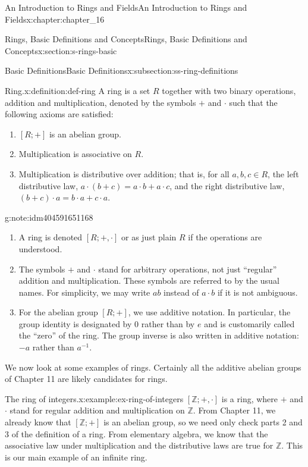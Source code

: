 \documentclass[twoside,10pt,]{book}
\numberwithin{equation}{section}
\begin{document}
\begin{chapterptx}{An Introduction to Rings and Fields}{}{An Introduction to Rings and Fields}{}{}{x:chapter:chapter_16}
\begin{sectionptx}{Rings, Basic Definitions and Concepts}{}{Rings, Basic Definitions and Concepts}{}{}{x:section:s-rings-basic}
\begin{subsectionptx}{Basic Definitions}{}{Basic Definitions}{}{}{x:subsection:ss-ring-definitions}
\begin{definition}{Ring.}{x:definition:def-ring}
%
\label{g:notation:idm404591659744}%
A ring is a set \(R\) together with two binary operations, addition and multiplication, denoted by the symbols \(+\) and \(\cdot\) such that the following axioms are satisfied:%
\begin{enumerate}[label=(\arabic*)]
\item{}\([R; +]\) is an abelian group.%
\item{}Multiplication is associative on \(R\).%
\item{}Multiplication is distributive over addition; that is, for all \(a, b, c \in R\), the left distributive law, \(a \cdot (b + c) = a \cdot b + a\cdot c\), and the right distributive law, \((b + c)\cdot a = b\cdot a + c\cdot a\).%
\end{enumerate}
%
\end{definition}
\begin{note}{}{g:note:idm404591651168}%
%
\begin{enumerate}[label=(\arabic*)]
\item{}A ring is denoted  \([R;+, \cdot ]\) or as just plain \(R\) if the operations are understood.%
\item{}The symbols \(+\) and \(\cdot\) stand for arbitrary operations, not just ``regular'' addition and multiplication. These symbols are referred to by the usual names. For simplicity, we may write \(a b\) instead of \(a\cdot b\) if it is not ambiguous.%
\item{}For the abelian group \([R; +]\), we use additive notation. In particular, the group identity is designated by 0 rather than by \(e\) and is customarily called the ``zero'' of the ring. The group inverse is also written in additive notation: \(-a\) rather than \(a^{-1}\).%
\end{enumerate}
%
\end{note}
We now look at some examples of rings. Certainly all the additive abelian groups of Chapter 11 are likely candidates for rings.%
\begin{example}{The ring of integers.}{x:example:ex-ring-of-integers}%
\([\mathbb{Z}; +, \cdot ]\) is a ring, where \(+\) and \(\cdot\) stand for regular addition and multiplication on \(\mathbb{Z}\). From Chapter 11, we already know that \([\mathbb{Z}; +]\) is an abelian group, so we need only check parts 2 and 3 of the definition of a ring. From elementary algebra, we know that the associative law under multiplication and the distributive laws are true for \(\mathbb{Z}\). This is our main example of an infinite ring.%
\end{example}

\end{subsectionptx}
\end{sectionptx}
\end{chapterptx}
\end{document}
